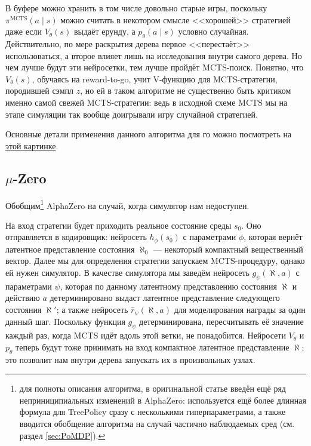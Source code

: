 В буфере можно хранить в том числе довольно старые игры, поскольку $\pi^{\mathrm{MCTS}}(a \mid s)$ можно считать в некотором смысле <<хорошей>> стратегией даже если $V_\theta(s)$ выдаёт ерунду, а $p_{\theta}(a \mid s)$ условно случайная. Действительно, по мере раскрытия дерева первое <<перестаёт>> использоваться, а второе влияет лишь на исследования внутри самого дерева. Но чем лучше будут эти нейросетки, тем лучше пройдёт MCTS-поиск. Понятно, что $V_{\theta}(s)$, обучаясь на reward-to-go, учит V-функцию для MCTS-стратегии, породившей сэмпл $z$, но ей в таком алгоритме не существенно быть критиком именно самой свежей MCTS-стратегии: ведь в исходной схеме MCTS мы на этапе симуляции так вообще доигрывали игру случайной стратегией.

\begin{example}
Основные детали применения данного алгоритма для го можно посмотреть на \href{https://miro.medium.com/max/2000/1*0pn33bETjYOimWjlqDLLNw.png}{этой картинке}.
\end{example}

\subsection{$\mu$-Zero}

Обобщим\footnote{для полноты описания алгоритма, в оригинальной статье введён ещё ряд неприниципиальных изменений в AlphaZero: используется ещё более длинная формула для TreePolicy сразу с несколькими гиперпараметрами, а также вводится обобщение алгоритма на случай частично наблюдаемых сред (см. раздел \ref{sec:PoMDP}).} AlphaZero на случай, когда симулятор нам недоступен.

На вход стратегии будет приходить реальное состояние среды $s_0$. Оно отправляется в кодировщик: нейросеть $h_{\phi}(s_0)$ с параметрами $\phi$, которая вернёт латентное представление состояния $\aleph_0$ --- некоторый компактный вещественный вектор. Далее мы для определения стратегии запускаем MCTS-процедуру, однако ей нужен симулятор. В качестве симулятора мы заведём нейросеть $g_{\psi}(\aleph, a)$ с параметрами $\psi$, которая по данному латентному представлению состояния $\aleph$ и действию $a$ детерминировано выдаст латентное представление следующего состояния $\aleph'$; а также нейросеть $\hat{r}_{\psi}(\aleph, a)$ для моделирования награды за один данный шаг. Поскольку функция $g_{\psi}$ детерминирована, пересчитывать её значение каждый раз, когда MCTS идёт вдоль этой ветки, не понадобится. Нейросети $V_{\theta}$ и $p_{\theta}$ теперь будут тоже принимать на вход компактное латентное представление $\aleph$; это позволит нам внутри дерева запускать их в произвольных узлах.

